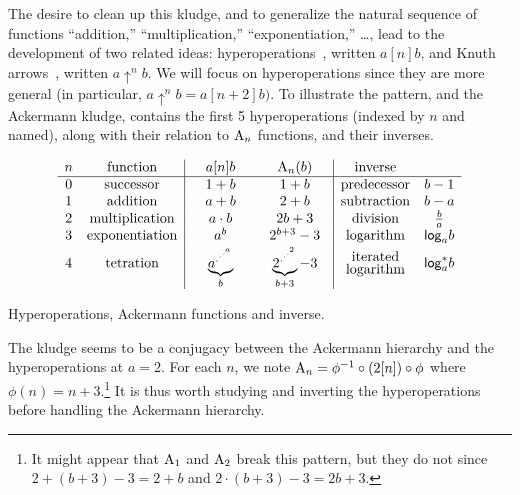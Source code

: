 The desire to clean up this kludge, and to generalize the natural sequence 
of functions ``addition,'' ``multiplication,'' ``exponentiation,'' \ldots, 
lead to the development of two related ideas: hyperoperations~\cite{blah}, 
written $a [n] b$, and Knuth arrows~\cite{blah}, written $a \uparrow^n b$.  
We will focus on hyperoperations since they are more general 
(in particular, $a \uparrow^n b = a[n+2]b)$.
To illustrate the pattern, and the Ackermann kludge,  contains the first 5 hyperoperations (indexed by $n$ and named), along with their relation to $\text{A}_n$ functions, and their inverses.
\begin{table}[h]
	\[
\begin{array}{cc|cc|cc}
n & \text{function} & \quad a [n] b \quad & \quad \Ack_n(b) \quad & \text{inverse} \\
\hline
0 & \text{successor} & 1 + b & 1 + b & \text{predecessor} & b - 1 \\
1 & \text{addition} & a + b & 2 + b & \text{subtraction} & b - a \\
2 & \text{multiplication} & a \cdot b & 2b + 3 & \text{division} & \frac{b}{a}\\
3 & \text{exponentiation} & a^b & 2^{b + 3} - 3 & \text{logarithm} & \mathsf{log}_a b \\
[2pt]
4 & \text{tetration} & \underbrace{a^{.^{.^{.^a}}}}_b & \underbrace{2^{.^{.^{.^2}}}}_{b+3} - 3 & \begin{array}{@{}c@{}}\text{iterated}\\[-3pt]\text{logarithm}\end{array} & \mathsf{log}^*_a b 
\end{array}
\] \caption{Hyperoperations, Ackermann functions and inverse.}
\label{table: hyperop-ack-inv}
\end{table}

The kludge seems to be a conjugacy between the Ackermann hierarchy and the hyperoperations at $a=2$. For each $n$, we note $\text{A}_n = \phi^{-1}\circ \left(2[n]\right)\circ\phi$ where $\phi(n) = n+3$.\footnote{It might appear that $\text{A}_{1}$ and $\text{A}_{2}$ break this pattern, but they do not since $2 + (b + 3) - 3 = 2 + b$ and $2 \cdot (b + 3) - 3 = 2b + 3$.} It is thus worth studying and inverting the hyperoperations before handling the Ackermann hierarchy.

